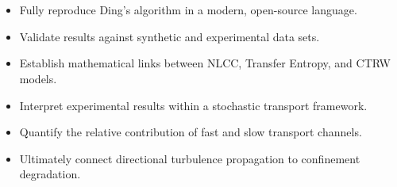 \documentclass{article}
\begin{document}
\section{}

\begin{itemize}
\item Fully reproduce Ding’s algorithm in a modern, open-source language.
\item Validate results against synthetic and experimental data sets.
\item Establish mathematical links between NLCC, Transfer Entropy, and CTRW models.
\item Interpret experimental results within a stochastic transport framework.
\item Quantify the relative contribution of fast and slow transport channels.
\item Ultimately connect directional turbulence propagation to confinement degradation.
\end{itemize}
\end{document}

